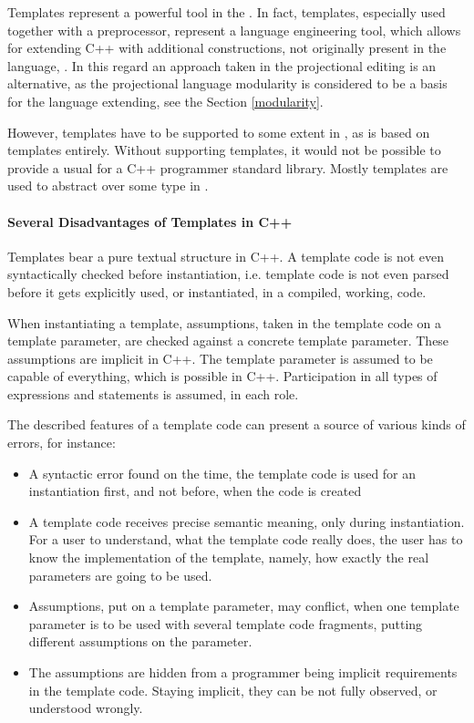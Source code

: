 
\cppproblem


Templates represent a powerful tool in the \cpppl. 
In fact, templates, especially used together with a preprocessor, represent a language engineering tool, which allows
for extending C++ with additional 
constructions, not originally present in the language, \cite{alexandrescu}. In this regard an approach 
taken in the projectional editing is an alternative, as the projectional language modularity is considered to be 
a basis for the language extending, see the Section \ref{modularity}.

However, templates have to be supported to some extent in \pcpp, as  is based on templates entirely. Without 
supporting templates, it would not be possible to provide a usual for a C++ programmer standard library. Mostly
templates are used to abstract over some type in .

\paragraph{Several Disadvantages of Templates in C++}  Templates bear a pure textual structure in C++. A template code is not even syntactically checked before instantiation,
i.e. template code is not even parsed before it gets explicitly used, or instantiated, in a compiled, working, code.

When instantiating a template,  assumptions, taken in the template code on a template parameter, are checked against 
a concrete template parameter. These assumptions are implicit in C++. The template parameter
is assumed to be capable of everything, which is possible in C++. Participation in all types of expressions and statements
is assumed, in each role.

The described features of a template code can present a source of various kinds of errors,
for instance:
\begin{itemize}
 \item A syntactic error found on the time, the template code is used for an instantiation first, 
 and not before, when the code is created
 
 \item A template code receives precise semantic meaning, only during instantiation.
 For a user to understand, what the template code really does, the user has to know the implementation of the template, namely,
 how exactly the real parameters are going to be used.
 
 \item Assumptions, put on a template parameter, may conflict, when one template parameter is to be used with several 
 template code fragments, putting different assumptions on the parameter.
 
 \item The assumptions are hidden from a programmer being implicit requirements in the template code. Staying implicit, they can
 be not fully observed, or understood wrongly.
 
\end{itemize}

